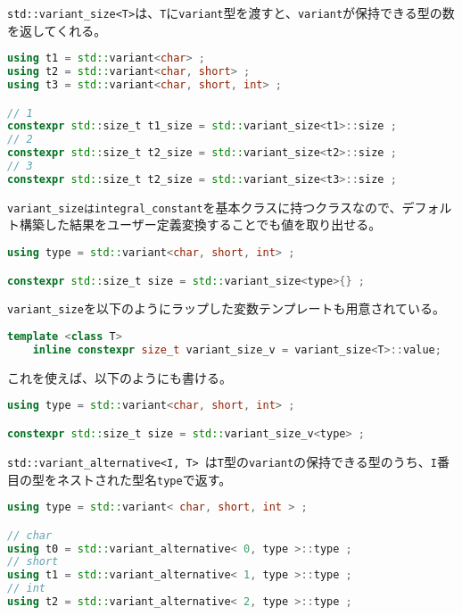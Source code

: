 \lstinline!std::variant_size<T>!は、\lstinline!T!に\lstinline!variant!型を渡すと、\lstinline!variant!が保持できる型の数を返してくれる。

\begin{lstlisting}[language=C++]
using t1 = std::variant<char> ;
using t2 = std::variant<char, short> ;
using t3 = std::variant<char, short, int> ;

// 1
constexpr std::size_t t1_size = std::variant_size<t1>::size ;
// 2
constexpr std::size_t t2_size = std::variant_size<t2>::size ;
// 3
constexpr std::size_t t2_size = std::variant_size<t3>::size ;
\end{lstlisting}

\lstinline!variant_sizeはintegral_constant!を基本クラスに持つクラスなので、デフォルト構築した結果をユーザー定義変換することでも値を取り出せる。

\begin{lstlisting}[language=C++]
using type = std::variant<char, short, int> ;

constexpr std::size_t size = std::variant_size<type>{} ;
\end{lstlisting}

\lstinline!variant_size!を以下のようにラップした変数テンプレートも用意されている。

\begin{lstlisting}[language=C++]
template <class T>
    inline constexpr size_t variant_size_v = variant_size<T>::value;
\end{lstlisting}

これを使えば、以下のようにも書ける。

\begin{lstlisting}[language=C++]
using type = std::variant<char, short, int> ;

constexpr std::size_t size = std::variant_size_v<type> ;
\end{lstlisting}

%

\lstinline!std::variant_alternative<I, T>!~は\lstinline!T!型の\lstinline!variant!の保持できる型のうち、\lstinline!I!番目の型をネストされた型名\lstinline!type!で返す。

\begin{lstlisting}[language=C++]
using type = std::variant< char, short, int > ;

// char
using t0 = std::variant_alternative< 0, type >::type ;
// short
using t1 = std::variant_alternative< 1, type >::type ;
// int
using t2 = std::variant_alternative< 2, type >::type ;
\end{lstlisting}

